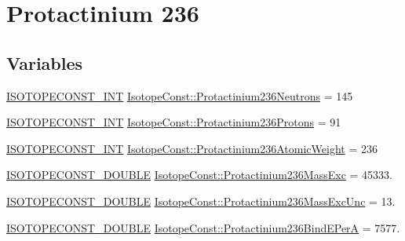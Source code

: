 \hypertarget{group___isotope_const-_protactinium-_pa236}{}\section{Protactinium 236}
\label{group___isotope_const-_protactinium-_pa236}
\subsection*{Variables}
\begin{DoxyCompactItemize}
\item 
\mbox{\hyperlink{group___isotope_const-_macros_ga5f18360b3e99483a35c32d789e62621c}{I\+S\+O\+T\+O\+P\+E\+C\+O\+N\+S\+T\+\_\+\+I\+NT}} \mbox{\hyperlink{group___isotope_const-_protactinium-_pa236_ga0dcdf4fdea6fcb01ab6cf69cf1a2152f}{Isotope\+Const\+::\+Protactinium236\+Neutrons}} = 145
\item 
\mbox{\hyperlink{group___isotope_const-_macros_ga5f18360b3e99483a35c32d789e62621c}{I\+S\+O\+T\+O\+P\+E\+C\+O\+N\+S\+T\+\_\+\+I\+NT}} \mbox{\hyperlink{group___isotope_const-_protactinium-_pa236_ga92aa44adacc81a64ff1d862be79a8c70}{Isotope\+Const\+::\+Protactinium236\+Protons}} = 91
\item 
\mbox{\hyperlink{group___isotope_const-_macros_ga5f18360b3e99483a35c32d789e62621c}{I\+S\+O\+T\+O\+P\+E\+C\+O\+N\+S\+T\+\_\+\+I\+NT}} \mbox{\hyperlink{group___isotope_const-_protactinium-_pa236_ga32265e6209d0ee831f2b624bd4b67910}{Isotope\+Const\+::\+Protactinium236\+Atomic\+Weight}} = 236
\item 
\mbox{\hyperlink{group___isotope_const-_macros_ga8f45a7272ce02c0b4c65c44636ed719a}{I\+S\+O\+T\+O\+P\+E\+C\+O\+N\+S\+T\+\_\+\+D\+O\+U\+B\+LE}} \mbox{\hyperlink{group___isotope_const-_protactinium-_pa236_ga8be36957c3aed3a3fc0a3ea39908c5e4}{Isotope\+Const\+::\+Protactinium236\+Mass\+Exc}} = 45333.
\item 
\mbox{\hyperlink{group___isotope_const-_macros_ga8f45a7272ce02c0b4c65c44636ed719a}{I\+S\+O\+T\+O\+P\+E\+C\+O\+N\+S\+T\+\_\+\+D\+O\+U\+B\+LE}} \mbox{\hyperlink{group___isotope_const-_protactinium-_pa236_ga18748d7e833f3c79a9d16b3c89282686}{Isotope\+Const\+::\+Protactinium236\+Mass\+Exc\+Unc}} = 13.
\item 
\mbox{\hyperlink{group___isotope_const-_macros_ga8f45a7272ce02c0b4c65c44636ed719a}{I\+S\+O\+T\+O\+P\+E\+C\+O\+N\+S\+T\+\_\+\+D\+O\+U\+B\+LE}} \mbox{\hyperlink{group___isotope_const-_protactinium-_pa236_ga09426fb6571c91de85965207208312e7}{Isotope\+Const\+::\+Protactinium236\+Bind\+E\+PerA}} = 7577.

\end{DoxyCompactItemize}
